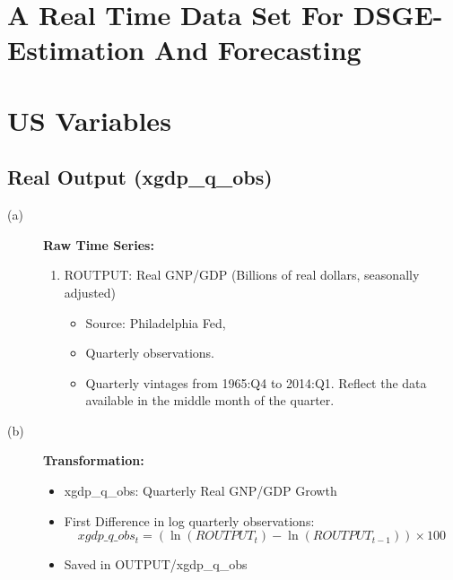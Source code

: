 \documentclass[3p,review,times]{elsarticle}		%
\begin{document}
\newpage
\linenumbers



\section{A Real Time Data Set For DSGE-Estimation And Forecasting }
\label{}

\newtheorem{T0}{Theorem}
\newtheorem{D1}{Lemma}


\section{US Variables}
\subsection{Real Output (xgdp\_q\_obs)}
\begin{description}
	\item[(a)] \textbf{Raw Time Series:}
	\begin{enumerate}
		\item ROUTPUT: Real GNP/GDP (Billions of real dollars, seasonally adjusted)
		\begin{itemize}
			\item Source: Philadelphia Fed,
			\item Quarterly observations.
			\item Quarterly vintages from 1965:Q4 to 2014:Q1. Reflect the data available in the middle month of the quarter.
		\end{itemize}			
	\end{enumerate}
	\item[(b)] \textbf{Transformation:}
	\begin{itemize}
		\item xgdp\_q\_obs: Quarterly  Real GNP/GDP Growth
		\item First Difference in log quarterly observations:
		$$xgdp\_q\_obs_{t}=(\ln(ROUTPUT_t)-\ln(ROUTPUT_{t-1}))\times 100$$
		\item Saved in OUTPUT/xgdp\_q\_obs
	\end{itemize}
\end{description}
\end{document}
